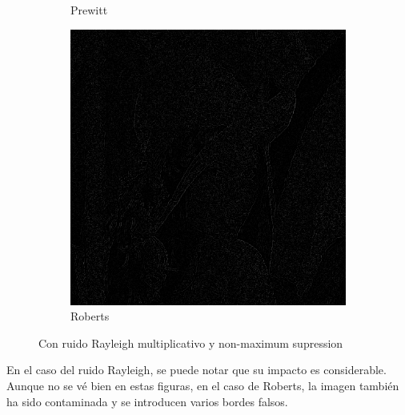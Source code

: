 \documentclass[a4paper]{article}
\begin{document}
\begin{figure}[H]
\begin{subfigure}[t]{0.3\textwidth}
	\caption{Prewitt}
	\end{subfigure}
	\begin{subfigure}[t]{0.3\textwidth}
	\centering
	\includegraphics[width=\textwidth]{imagenesInforme/lenaNonMaximumSupressionRayleighRoberts}
	\caption{Roberts}
	\end{subfigure}
\caption{Con ruido Rayleigh multiplicativo y non-maximum supression}
\end{figure}

En el caso del ruido Rayleigh, se puede notar que su impacto es considerable. Aunque no se vé bien en estas figuras, en el caso de Roberts, la imagen también ha sido contaminada y se introducen varios bordes falsos.
\end{document}
